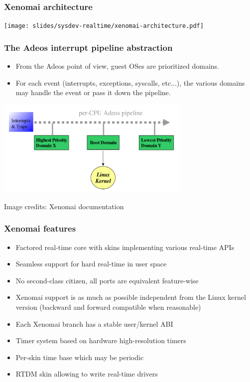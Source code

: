 \begin{frame}
  \frametitle{Xenomai architecture}
  \begin{center}
    \texttt{[image: slides/sysdev-realtime/xenomai-architecture.pdf]}
  \end{center}
\end{frame}

\begin{frame}
  \frametitle{The Adeos interrupt pipeline abstraction}
  \begin{itemize}
  \item From the Adeos point of view, guest OSes are prioritized
    domains.
  \item For each event (interrupts, exceptions, syscalls, etc...), the
    various domains may handle the event or pass it down the pipeline.
  \end{itemize}
  \begin{center}
    \includegraphics[width=0.7\textwidth]{slides/sysdev-realtime/adeos-interrupt-pipeline1.png}
  \end{center}
  \tiny Image credits: Xenomai documentation
\end{frame}

\begin{frame}
  \frametitle{Xenomai features}
  \begin{itemize}
  \item Factored real-time core with skins implementing various
    real-time APIs
  \item Seamless support for hard real-time in user space
  \item No second-class citizen, all ports are equivalent feature-wise
  \item Xenomai support is as much as possible independent from the
    Linux kernel version (backward and forward compatible when
    reasonable)
  \item Each Xenomai branch has a stable user/kernel ABI
  \item Timer system based on hardware high-resolution timers
  \item Per-skin time base which may be periodic
  \item RTDM skin allowing to write real-time drivers
  \end{itemize}
\end{frame}

